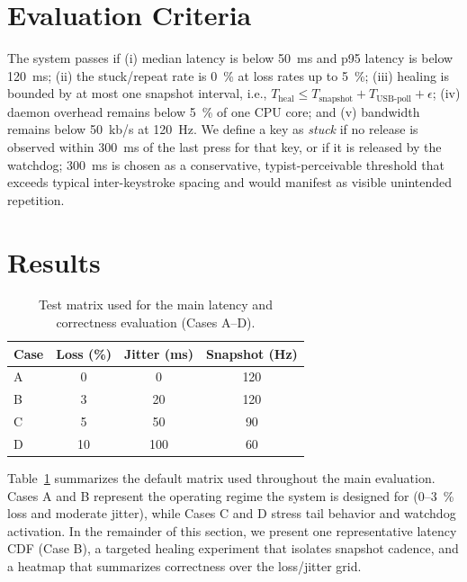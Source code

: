 \documentclass[11pt]{article}
\begin{document}
\section{Evaluation Criteria}
The system passes if (i) median latency is below \SI{50}{ms} and p95 latency is below \SI{120}{ms}; (ii) the stuck/repeat rate is \SI{0}{\percent} at loss rates up to \SI{5}{\percent}; (iii) healing is bounded by at most one snapshot interval, i.e., \(T_{\mathrm{heal}} \le T_{\mathrm{snapshot}} + T_{\mathrm{USB\text{-}poll}} + \epsilon\); (iv) daemon overhead remains below \SI{5}{\percent} of one CPU core; and (v) bandwidth remains below \SI{50}{kb/s} at \SI{120}{Hz}. We define a key as \emph{stuck} if no release is observed within \SI{300}{ms} of the last press for that key, or if it is released by the watchdog; \SI{300}{ms} is chosen as a conservative, typist-perceivable threshold that exceeds typical inter-keystroke spacing and would manifest as visible unintended repetition.

\section{Results}
\begin{table}[H]
  \centering
  \caption{Test matrix used for the main latency and correctness evaluation (Cases A--D).}
  \label{tab:matrix}
  \begin{tabular}{lccc}
    \toprule
    Case & Loss (\%) & Jitter (ms) & Snapshot (Hz) \\
    \midrule
    A & 0 & 0 & 120 \\
    B & 3 & 20 & 120 \\
    C & 5 & 50 & 90 \\
    D & 10 & 100 & 60 \\
    \bottomrule
  \end{tabular}
\end{table}
Table~\ref{tab:matrix} summarizes the default matrix used throughout the main evaluation. Cases A and B represent the operating regime the system is designed for (0--\SI{3}{\percent} loss and moderate jitter), while Cases C and D stress tail behavior and watchdog activation. In the remainder of this section, we present one representative latency CDF (Case B), a targeted healing experiment that isolates snapshot cadence, and a heatmap that summarizes correctness over the loss/jitter grid.
\end{document}
